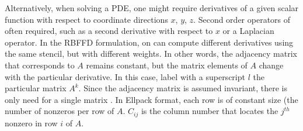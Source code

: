 Alternatively, when solving a PDE, one might require derivatives of a given scalar function with respect to coordinate directions $x$, $y$, $z$. Second order operators of often required, such as a second derivative with respect to $x$ or a Laplacian operator. In the RBFFD formulation, on can compute different derivatives using the same stencil, but with different weights. In other words, the adjacency matrix that corresponds to $A$ remains constant, but the matrix elements of $A$ change with the particular derivative. 
In this case, label with a superscript $l$ the particular matrix $A^k$. Since the adjacency matrix is assumed invariant, there is only need for a single matrix . In Ellpack format, each row is of constant size (the number of nonzeros per row of $A$. $C_{ij}$ is the column number that locates the $j^{th}$ nonzero in row $i$ of $A$.

